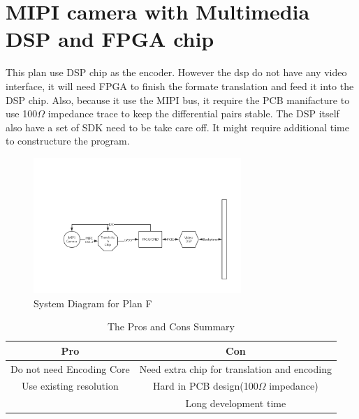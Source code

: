 \documentclass[12pt,article]{memoir}
\begin{document}
\section{MIPI camera with Multimedia DSP and FPGA chip}
This plan use DSP chip as the encoder. However the dsp do not have any video interface, it will need FPGA to finish the formate translation and feed it into the DSP chip. Also, because it use the MIPI bus, it require the PCB manifacture to use 100$\Omega$ impedance trace to keep the differential pairs stable. The DSP itself also have a set of SDK need to be take care off. It might require additional time to constructure the program.
\begin{figure}[htp]
\begin{center}
\includegraphics[width=0.7\textwidth]{DR00002_Plan5-2.png}
 \caption{System Diagram for Plan F}	
\end{center}
\end{figure}
\begin{table}[H]
	\centering
		\begin{tabu}{c | c }
		Pro & Con \\ \hline
		Do not need Encoding Core & Need extra chip for translation and encoding\\
		Use existing resolution & Hard in PCB design(100$\Omega$ impedance) \\
		 & Long development time \\
		\end{tabu}
	\caption{The Pros and Cons Summary}
\end{table}
\newpage
\end{document}
